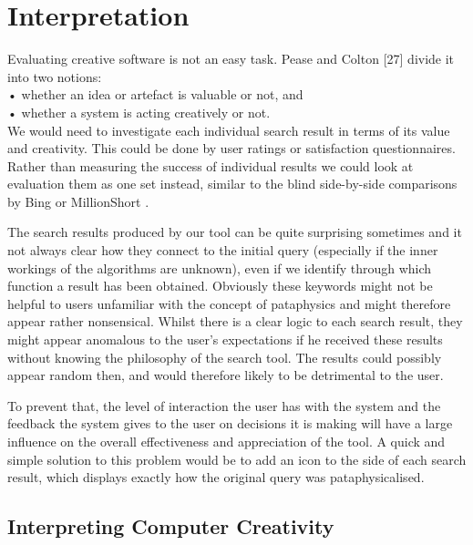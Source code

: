 
\pagestyle{fancy}

\chapter{Interpretation}
\label{Interpretation}


Evaluating creative software is not an easy task. Pease and Colton [27] divide it into two notions: \\
•	whether an idea or artefact is valuable or not, and\\
•	whether a system is acting creatively or not.\\
We would need to investigate each individual search result in terms of its value and creativity. This could be done by user ratings or satisfaction questionnaires. Rather than measuring the success of individual results we could look at evaluation them as one set instead, similar to the blind side-by-side comparisons by Bing or MillionShort .

The search results produced by our tool can be quite surprising sometimes and it not always clear how they connect to the initial query (especially if the inner workings of the algorithms are unknown), even if we identify through which function a result has been obtained. Obviously these keywords might not be helpful to users unfamiliar with the concept of pataphysics and might therefore appear rather nonsensical. Whilst there is a clear logic to each search result, they might appear anomalous to the user’s expectations if he received these results without knowing the philosophy of the search tool. The results could possibly appear random then, and would therefore likely to be detrimental to the user.

To prevent that, the level of interaction the user has with the system and the feedback the system gives to the user on decisions it is making will have a large influence on the overall effectiveness and appreciation of the tool. A quick and simple solution to this problem would be to add an icon to the side of each search result, which displays exactly how the original query was pataphysicalised.


\section{Interpreting Computer Creativity}

